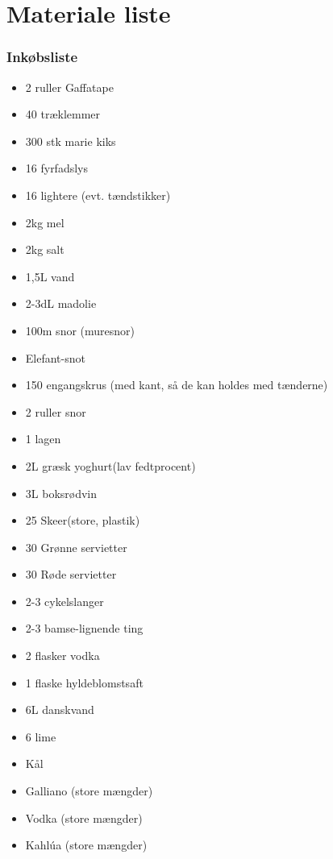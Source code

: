 \section{Materiale liste}
\subsubsection*{Inkøbsliste}
\begin{itemize}
  \item 2 ruller Gaffatape
  \item 40 træklemmer
  \item 300 stk marie kiks
  \item 16 fyrfadslys
  \item 16 lightere (evt. tændstikker)
  \item 2kg mel
  \item 2kg salt
  \item 1,5L vand
  \item 2-3dL madolie
  \item 100m snor (muresnor)
  \item Elefant-snot
  \item 150 engangskrus (med kant, så de kan holdes med tænderne)
  \item 2 ruller snor
  \item 1 lagen
  \item 2L græsk yoghurt(lav fedtprocent)
  \item 3L boksrødvin
  \item 25 Skeer(store, plastik)
  \item 30 Grønne servietter
  \item 30 Røde servietter
  \item 2-3 cykelslanger
  \item 2-3 bamse-lignende ting
  \item 2 flasker vodka
  \item 1 flaske hyldeblomstsaft
  \item 6L danskvand
  \item 6 lime
  \item Kål
  \item Galliano (store mængder)
  \item Vodka (store mængder)
  \item Kahlúa (store mængder)
\end{itemize}
    
